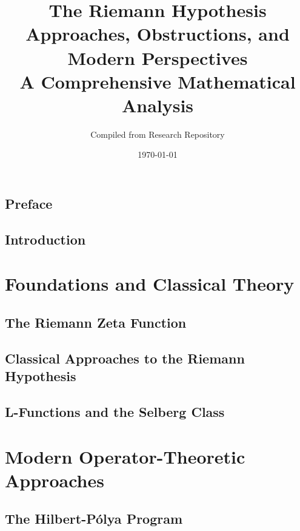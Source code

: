 \documentclass[12pt,a4paper,twoside]{book}
\title{{\Huge \textbf{The Riemann Hypothesis}}\\[1cm]
{\Large Approaches, Obstructions, and Modern Perspectives}\\[2cm]
{\large A Comprehensive Mathematical Analysis}}
\author{Compiled from Research Repository}
\date{\today}
\theoremstyle{plain}
\theoremstyle{definition}
\theoremstyle{remark}
\begin{document}
\frontmatter

\maketitle

\tableofcontents

\chapter*{Preface}


\chapter*{Introduction}


\mainmatter

\part{Foundations and Classical Theory}

\chapter{The Riemann Zeta Function}
\label{ch:riemann_zeta}


\chapter{Classical Approaches to the Riemann Hypothesis}
\label{ch:classical_approaches}


\chapter{L-Functions and the Selberg Class}
\label{ch:l_functions}


\part{Modern Operator-Theoretic Approaches}

\chapter{The Hilbert-Pólya Program}
\label{ch:hilbert_polya}

\end{document}
